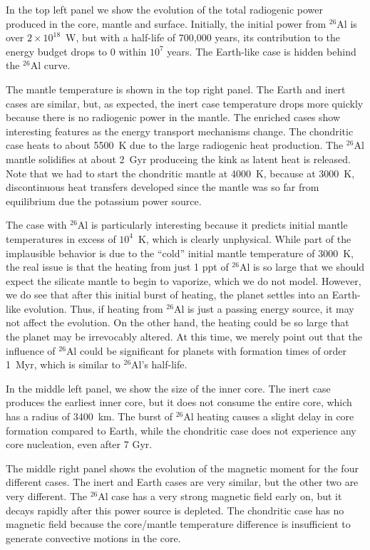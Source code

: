 \documentclass[preprint,12pt]{aastex}
\begin{document}
In the top left panel we show the evolution of the total radiogenic
power produced in the core, mantle and surface. Initially, the initial
power from $^{26}$Al is over $2 \times 10^{18}$~W, but with a
half-life of 700,000 years, its contribution to the energy budget
drops to 0 within $10^7$ years. The Earth-like case is hidden behind
the $^{26}$Al curve.

The mantle temperature is shown in the top right
panel. The Earth and inert cases are similar, but, as expected, the
inert case temperature drops more quickly because there is no
radiogenic power in the mantle. The enriched cases show interesting
features as the energy transport mechanisms change. The chondritic
case heats to about 5500~K due to the large radiogenic heat
production. The $^{26}$Al mantle solidifies at about 2~Gyr produceing
the kink as latent heat is released. Note that we had to start the
chondritic mantle at 4000~K, because at 3000~K, discontinuous heat
transfers developed since the mantle was so far from equilibrium due
the potassium power source.

The case with $^{26}$Al is particularly interesting because it
predicts initial mantle temperatures in excess of $10^4$~K, which is
clearly unphysical. While part of the implausible behavior is due to
the ``cold'' initial mantle temperature of 3000~K, the real issue is
that the heating from just 1 ppt of $^{26}$Al is so large that we should expect the silicate mantle to begin to vaporize, which we do not model. However, we do see that after this initial
burst of heating, the planet settles into an Earth-like
evolution. Thus, if heating from $^{26}$Al is just a passing energy
source, it may not affect the evolution. On the other hand, the
heating could be so large that the planet may be irrevocably
altered. At this time, we merely point out that the influence of
$^{26}$Al could be significant for planets with formation times of
order 1~Myr, which is similar to $^{26}$Al's half-life.

In the middle left panel, we show the size of the inner core. The
inert case produces the earliest inner core, but it does not consume the
entire core, which has a radius of 3400~km. The burst of $^{26}$Al
heating causes a slight delay in core formation compared to Earth,
while the chondritic case does not experience any core nucleation, even
after 7 Gyr.

The middle right panel shows the evolution of the magnetic moment for
the four different cases. The inert and Earth cases are very similar,
but the other two are very different. The $^{26}$Al case has a very
strong magnetic field early on, but it decays rapidly after this power
source is depleted. The chondritic case has no magnetic field because
the core/mantle temperature difference is insufficient to generate
convective motions in the core.
\end{document}
